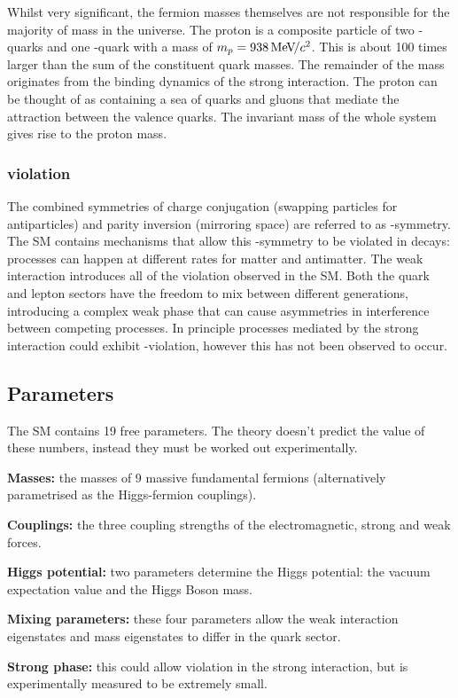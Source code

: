 Whilst very significant, the fermion masses themselves are not responsible for the majority of mass in the universe. The proton is a composite particle of two \uquark-quarks and one \dquark-quark with a mass of $m_{{p}}=938{\mathrm{\,Me\kern -0.1em V\!/}c^2}$. This is about 100 times larger than the sum of the constituent quark masses. The remainder of the mass originates from the  binding dynamics of the strong interaction. The proton can be thought of as containing a sea of quarks and gluons that mediate the attraction between the valence quarks. The invariant mass of the whole system gives rise to the proton mass. 
 

\subsubsection{\CP violation}

The combined symmetries of charge conjugation (swapping particles for antiparticles) and parity inversion (mirroring space) are referred to as \CP-symmetry. The SM contains mechanisms that allow this \CP-symmetry to be violated in decays: processes can happen at different rates for matter and antimatter.  
The weak interaction introduces all of the \CP violation observed in the SM. Both the quark and lepton sectors have the freedom to mix between different generations, introducing a complex weak phase that can cause asymmetries in interference between competing processes. In principle processes mediated by the strong interaction could exhibit \CP-violation, however this has not been observed to occur. 

\subsection{Parameters}

The SM contains 19 free parameters. The theory doesn't predict the value of these numbers, instead they must be worked out experimentally.  
\begin{description}
\item \textbf{Masses:} the masses of 9 massive fundamental fermions (alternatively parametrised as the Higgs-fermion couplings).
\item \textbf{Couplings:} the three coupling strengths of the electromagnetic, strong and weak forces.
\item \textbf{Higgs potential:} two parameters determine the Higgs potential: the vacuum expectation value and the Higgs Boson mass.
\item \textbf{Mixing parameters:} these four parameters allow the weak interaction eigenstates and mass eigenstates to differ in the quark sector.
\item \textbf{Strong \CP  phase:} this could allow \CP violation in the strong interaction, but is experimentally measured to be extremely small.
\end{description}

